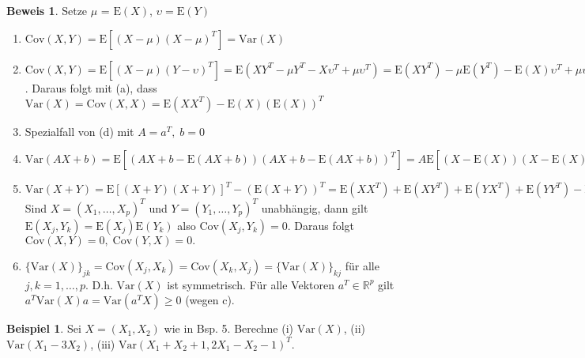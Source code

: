 \documentclass[12pt, a4paper]{article}
\newcommand{\E}{\mbox{I\negthinspace E}}
\theoremstyle{plain}
\theoremstyle{definition}
\newtheorem{beispiel}[thm]{Beispiel}
\newtheorem*{beweis}{Beweis}
\newcommand{\R}{\mathbb{R}}
\newcommand{\1}{\mathds{1}}
\renewcommand{\E}{\mathrm{E}}
\newcommand{\Var}{\mathrm{Var}}
\newcommand{\Cov}{\mathrm{Cov}}
\begin{document}
\begin{beweis} Setze $\mu$ = $\E(X)$, $\upsilon = \E(Y)$ \end{beweis}
\begin{enumerate} %
\item $\Cov (X,Y) = \E[(X-\mu)(X-\mu)^T] = \Var(X)$\\
\item $\Cov(X,Y) = \E[(X-\mu)(Y-\upsilon)^T] = \E(XY^T - \mu Y^T - X\upsilon^T + \mu \upsilon^T) = \E(XY^T) - \mu \E(Y^T) - \E(X)\upsilon^T + \mu \upsilon^T = \E(XY^T - \E(X)(\E(Y))^T$. Daraus folgt mit (a), dass $\Var(X) = \Cov(X,X) = \E(XX^T) - \E(X)(\E(X))^T $\\
\item Spezialfall von (d) mit $A = a^T, \; b = 0$\\
\item $\Var(AX + b) = \E[(AX + b - \E(AX + b)) (AX + b - \E(AX + b))^T ] = A \E[(X-\E(X)) (X-\E(X))^T A^T ] = A \Var(X) A^T $\\

\item $\Var(X + Y) = \E[(X + Y)(X+Y)]^T - (\E(X+Y))^T = \E(XX^T) + \E(XY^T) + \E(YX^T) + \E(YY^T) - \E(X)(\E(X))^T - \E(X)(\E(Y))^T - \E(Y)(\E(X))^T - \E(Y)(\E(Y))^T = \Var(X) + \Cov(X,Y) + \Cov(Y,X) + \Var(Y). $ Sind $X = (X_1, \ldots, X_p)^T$ und $Y = (Y_1, \ldots, Y_p)^T$ unabhängig, dann gilt $\E(X_j, Y_k) = \E(X_j)\E(Y_k)$ also $\Cov(X_j, Y_k) = 0$. Daraus folgt $\Cov(X,Y) = 0, \; \Cov(Y,X) = 0.$\\
\item $ \{ \Var(X) \}_{jk} = \Cov(X_j, X_k) = \Cov(X_k, X_j) = \{ \Var(X) \}_{kj}$ für alle $j,k = 1, \ldots, p$. D.h. $\Var(X)$ ist symmetrisch.
Für alle Vektoren $a^T \in \R^p$ gilt $a^T \Var(X)a = \Var(a^T X) \geq 0$ (wegen c).\\

\end{enumerate}

\begin{beispiel} Sei $X = (X_1, X_2)$ wie in Bsp. 5. Berechne (i) $\Var(X)$, (ii) $\Var(X_1 - 3X_2)$, (iii) $\Var(X_1 + X_2 + 1, 2X_1 - X_2 - 1)^T$.
\end{beispiel}
\end{document}
